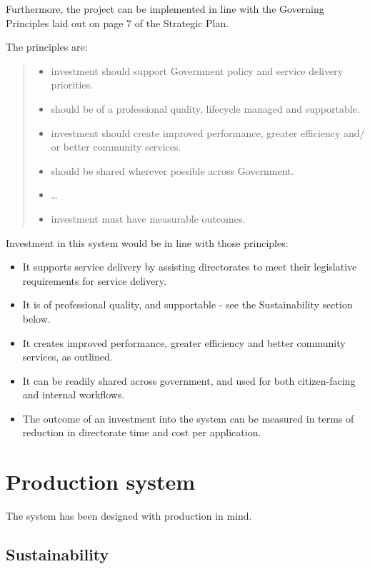 \documentclass[12pt,a4paper,twosided]{article}
\begin{document}
Furthermore, the project can be implemented in line with the Governing
Principles laid out on page 7 of the Strategic Plan.

The principles are:

\begin{quote}
\begin{itemize}

\item
  investment should support Government policy and service delivery
  priorities.
\item
  should be of a professional quality, lifecycle managed and
  supportable.
\item
  investment should create improved performance, greater efficiency and/
  or better community services.
\item
  should be shared wherever possible across Government.
\item
  \ldots{}
\item
  investment must have measurable outcomes.
\end{itemize}
\end{quote}

Investment in this system would be in line with those principles:

\begin{itemize}

\item
  It supports service delivery by assisting directorates to meet their
  legislative requirements for service delivery.
\item
  It is of professional quality, and supportable - see the
  Sustainability section below.
\item
  It creates improved performance, greater efficiency and better
  community services, as outlined.
\item
  It can be readily shared across government, and used for both
  citizen-facing and internal workflows.
\item
  The outcome of an investment into the system can be measured in terms
  of reduction in directorate time and cost per application.
\end{itemize}

\newpage
\section{Production system}

The system has been designed with production in mind.

\subsection{Sustainability}
\end{document}
